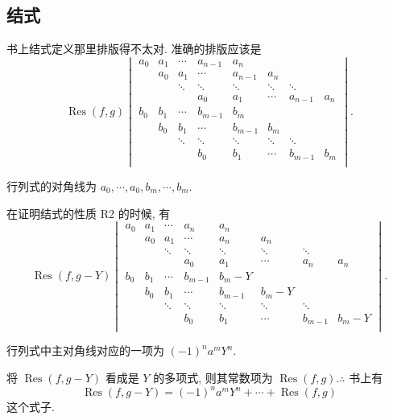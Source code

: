 \documentclass[UTF8]{ctexart}
\begin{document}
\subsection{结式}
书上结式定义那里排版得不太对. 准确的排版应该是
\[\operatorname{Res}(f,g)\begin{vmatrix}
    a_0 & a_1 & \cdots & a_{n-1} & a_n \\
    & a_0 & a_1 & \cdots & a_{n-1} & a_n \\
    && \ddots & \ddots & \ddots & \ddots & \ddots \\
    &&& a_0 & a_1 & \cdots & a_{n-1} & a_n \\
    b_0 & b_1 & \cdots & b_{m-1} & b_m \\
    & b_0 & b_1 & \cdots & b_{m-1} & b_m \\
    && \ddots & \ddots & \ddots & \ddots & \ddots \\
    &&& b_0 & b_1 & \cdots & b_{m-1} & b_m \\
\end{vmatrix}.\]

行列式的对角线为 $a_0,\cdots,a_0,b_m,\cdots,b_m$.

在证明结式的性质 R2 的时候, 有
\[\operatorname{Res}(f,g-Y)\begin{vmatrix}
    a_0 & a_1 & \cdots & a_n & a_n \\
    & a_0 & a_1 & \cdots & a_n & a_n \\
    && \ddots & \ddots & \ddots & \ddots & \ddots \\
    &&& a_0 & a_1 & \cdots & a_n & a_n \\
    b_0 & b_1 & \cdots & b_{m-1} & b_m-Y \\
    & b_0 & b_1 & \cdots & b_{m-1} & b_m-Y \\
    && \ddots & \ddots & \ddots & \ddots & \ddots \\
    &&& b_0 & b_1 & \cdots & b_{m-1} & b_m-Y \\
\end{vmatrix}.\]

行列式中主对角线对应的一项为 $(-1)^na^mY^n$.

将 $\operatorname{Res}(f,g-Y)$ 看成是 $Y$ 的多项式, 则其常数项为 $\operatorname{Res}(f,g).\therefore$ 书上有
\[\operatorname{Res}(f,g-Y)=(-1)^na^mY^n+\cdots+\operatorname{Res}(f,g)\]
这个式子.
\end{document}
